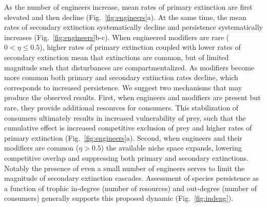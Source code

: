 \documentclass[twocolumn,preprintnumbers,amsmath,amssymb,superscriptaddress,linenumbers]{revtex4-1}
\begin{document}
As the number of engineers increase, mean rates of primary extinction are first elevated and then decline (Fig.\ \ref{fig:engineers}a).
At the same time, the mean rates of secondary extinction systematically decline and persistence systematically increases (Fig.\ \ref{fig:engineers}b-c).
When engineered modifiers are rare ($0 < \eta \leq 0.5$), higher rates of primary extinction coupled with lower rates of secondary extinction mean that extinctions are common, but of limited magnitude such that disturbances are compartmentalized.
As modifiers become more common both primary and secondary extinction rates decline, which corresponds to increased persistence.
We suggest two mechanisms that may produce the observed results.
First, when engineers and modifiers are present but rare, they provide additional resources for consumers.
This stabilization of consumers ultimately results in increased vulnerability of prey, such that the cumulative effect is increased competitive exclusion of prey and higher rates of primary extinction (Fig.\ \ref{fig:engineers}a).
Second, when engineers and their modifiers are common ($\eta > 0.5$) the available niche space expands, lowering competitive overlap and suppressing both primary and secondary extinctions.
Notably the presence of even a small number of engineers serves to limit the magnitude of secondary extinction cascades.
Assessment of species persistence as a function of trophic in-degree (number of resources) and out-degree (number of consumers) generally supports this proposed dynamic (Fig.\ \ref{fig:indeng}).

\end{document}
